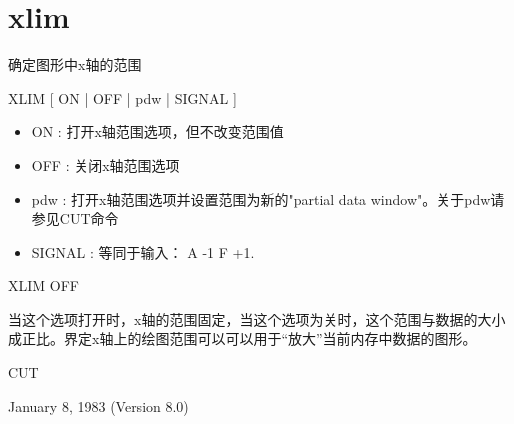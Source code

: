 \section{xlim}
\label{cmd:xlim}

确定图形中x轴的范围

XLIM [ ON | OFF | pdw | SIGNAL ]

\begin{itemize}
\item ON : 打开x轴范围选项，但不改变范围值 
\item OFF : 关闭x轴范围选项 
\item pdw : 打开x轴范围选项并设置范围为新的"partial data window"。关于pdw请参见CUT命令 
\item SIGNAL : 等同于输入： A -1 F +1. 
\end{itemize}

XLIM OFF

当这个选项打开时，x轴的范围固定，当这个选项为关时，这个范围与数据的大小成正比。界定x轴上的绘图范围可以可以用于``放大''当前内存中数据的图形。

CUT

January 8, 1983 (Version 8.0)
